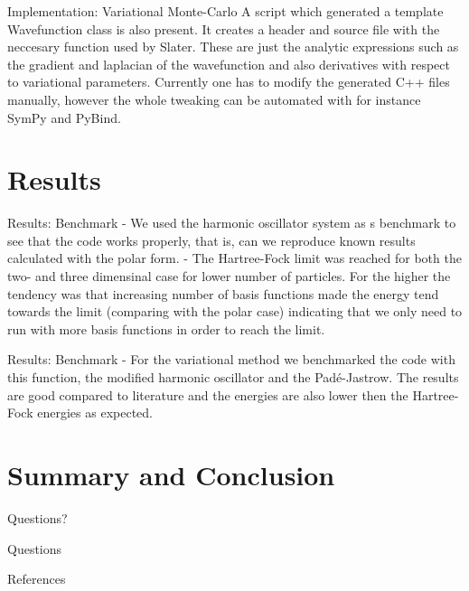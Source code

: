 \documentclass[10pt]{beamer}
\begin{document}
\begin{frame}[fragile]{Implementation: Variational Monte-Carlo}
    A script which generated a template Wavefunction class is also present. It
    creates a header and source file with the neccesary function used by
    Slater. These are just the analytic expressions such as the gradient and
    laplacian of the wavefunction and also derivatives with respect to
    variational parameters. Currently one has to modify the generated C++ files
    manually, however the whole tweaking can be automated with for instance
    SymPy and PyBind.
\end{frame}

\section{Results}

\begin{frame}[fragile]{Results: Benchmark}
    - We used the harmonic oscillator system as s benchmark to see that the
    code works properly, that is, can we reproduce known results calculated
    with the polar form.
    - The Hartree-Fock limit was reached for both the two- and three dimensinal
    case for lower number of particles. For the higher the tendency was that
    increasing number of basis functions made the energy tend towards the limit
    (comparing with the polar case) indicating that we only need to run with
    more basis functions in order to reach the limit.
\end{frame}

\begin{frame}[fragile]{Results: Benchmark}
    - For the variational method we benchmarked the code with this function,
    the modified harmonic oscillator and the Pad\'e-Jastrow. The results are
    good compared to literature and the energies are also lower then the
    Hartree-Fock energies as expected.
\end{frame}

\section{Summary and Conclusion}

{
\begin{frame}[standout]
  Questions?
\end{frame}
}

\appendix

\begin{frame}[fragile]{Questions}
\end{frame}

\begin{frame}[allowframebreaks]{References}

  
  

\end{frame}
\end{document}
